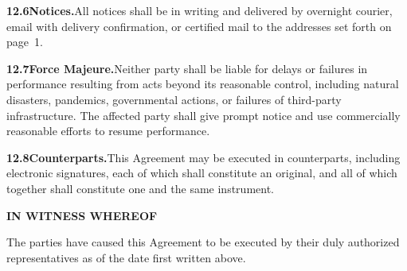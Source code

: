 \documentclass[11pt,a4paper]{article}
\begin{document}
\textbf{12.6\enspace Notices.}\enspace All notices shall be in writing and delivered by
overnight courier, email with delivery confirmation, or certified mail to the addresses
set forth on page~1.

\textbf{12.7\enspace Force Majeure.}\enspace Neither party shall be liable for delays or
failures in performance resulting from acts beyond its reasonable control, including natural
disasters, pandemics, governmental actions, or failures of third-party infrastructure.
The affected party shall give prompt notice and use commercially reasonable efforts to resume
performance.

\textbf{12.8\enspace Counterparts.}\enspace This Agreement may be executed in counterparts,
including electronic signatures, each of which shall constitute an original, and all of which
together shall constitute one and the same instrument.

\vspace{20pt}

\begin{tcolorbox}[
  enhanced,
  colback=NexaNavy,
  colframe=NexaNavy,
  arc=4pt,
  boxrule=0pt,
  left=0pt, right=0pt, top=0pt, bottom=0pt
]
  \begin{center}
    \color{white}\bfseries\large IN WITNESS WHEREOF
  \end{center}
  \vspace{2pt}
  \begin{center}
    \color{NexaRule}\small
    The parties have caused this Agreement to be executed by their duly authorized
    representatives as of the date first written above.
  \end{center}
\end{tcolorbox}

\vspace{14pt}
\end{document}
